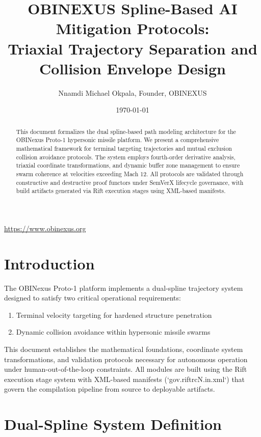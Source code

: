 \documentclass[11pt,a4paper]{article}
\title{OBINEXUS Spline-Based AI Mitigation Protocols:\\ 
Triaxial Trajectory Separation and Collision Envelope Design}
\author{Nnamdi Michael Okpala, Founder, OBINEXUS}
\date{\today}
\theoremstyle{definition}
\theoremstyle{plain}
\begin{document}
\maketitle

\begin{center}
\url{https://www.obinexus.org}
\end{center}

\begin{abstract}
This document formalizes the dual spline-based path modeling architecture for the OBINexus Proto-1 hypersonic missile platform. We present a comprehensive mathematical framework for terminal targeting trajectories and mutual exclusion collision avoidance protocols. The system employs fourth-order derivative analysis, triaxial coordinate transformations, and dynamic buffer zone management to ensure swarm coherence at velocities exceeding Mach 12. All protocols are validated through constructive and destructive proof functors under SemVerX lifecycle governance, with build artifacts generated via Rift execution stages using XML-based manifests.
\end{abstract}

\tableofcontents
\newpage

\section{Introduction}

The OBINexus Proto-1 platform implements a dual-spline trajectory system designed to satisfy two critical operational requirements:
\begin{enumerate}
    \item Terminal velocity targeting for hardened structure penetration
    \item Dynamic collision avoidance within hypersonic missile swarms
\end{enumerate}

This document establishes the mathematical foundations, coordinate system transformations, and validation protocols necessary for autonomous operation under human-out-of-the-loop constraints. All modules are built using the Rift execution stage system with XML-based manifests (`gov.riftrc{N}.in.xml`) that govern the compilation pipeline from source to deployable artifacts.

\section{Dual-Spline System Definition}
\end{document}
